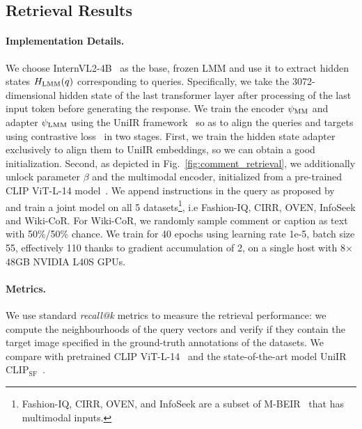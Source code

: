 \subsection{Retrieval Results}
\label{ssec:exp_retrieval} 

\paragraph{Implementation Details.} 
We choose InternVL2-4B~\cite{chen2024internvl} as the base, frozen LMM and use it to extract hidden states $H_{\text{LMM}}(q)$ corresponding to queries.
Specifically, we take the 3072-dimensional hidden state of the last transformer layer after processing of the last input token before generating the response.
%
We train the encoder $\psi_{\text{MM}}$ and adapter $\psi_{\text{LMM}}$ using the UniIR framework~\cite{wei2023uniir} so as to align the queries and targets using contrastive loss~\cite{ilharco2021openclip} in two stages.
First, we train the hidden state adapter exclusively to align them to UniIR embeddings, so we can obtain a good initialization.
Second, as depicted in Fig.~\ref{fig:comment_retrieval}, we additionally unlock parameter $\beta$ and the multimodal encoder, initialized from a pre-trained CLIP ViT-L-14 model~\cite{radford2021clip}. We append instructions in the query as proposed by~\cite{wei2023uniir} and train a joint model on all 5 datasets\footnote{Fashion-IQ, CIRR, OVEN, and InfoSeek are a subset of M-BEIR~\cite{wei2023uniir} that has multimodal inputs.}, i.e Fashion-IQ, CIRR, OVEN, InfoSeek and Wiki-CoR. %
For Wiki-CoR, we randomly sample comment or caption as text with 50\%/50\% chance. We train for 40 epochs using learning rate 1e-5, batch size 55, effectively 110 thanks to gradient accumulation of 2, on a single host with 8$\times$48GB NVIDIA L40S GPUs.



\paragraph{Metrics.} 
We use standard \emph{recall@k} metrics to measure the retrieval performance: we compute the neighbourhoods of the query vectors and verify if they contain the target image specified in the ground-truth annotations of the datasets.
We compare with pretrained CLIP ViT-L-14~\cite{radford2021clip} and the state-of-the-art model UniIR CLIP$_\text{SF}$~\cite{wei2023uniir}.
%
%
%

